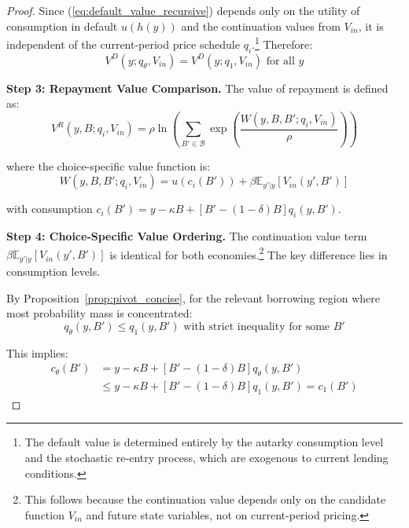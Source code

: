 \documentclass[12pt]{article}
\theoremstyle{plain}
\begin{document}
\begin{proof}
	Since (\ref{eq:default_value_recursive}) depends only on the utility of
	consumption in default $u(h(y))$ and the continuation values from $V_{in}$, it
	is independent of the current-period price schedule $q_i$.\footnote{The default
		value is determined entirely by the autarky consumption level and the
		stochastic re-entry process, which are exogenous to current lending
		conditions.} Therefore:
	\begin{equation}
		V^D(y; q_\theta, V_{in}) = V^D(y; q_1, V_{in}) \text{ for all } y \label{eq:default_value_equality}
	\end{equation}

	\textbf{Step 3: Repayment Value Comparison.} The value of repayment is defined as:
	\begin{equation}
		V^R(y, B; q_i, V_{in}) = \rho \ln\left( \sum_{B' \in \mathcal{B}} \exp\left(\frac{W(y, B, B'; q_i, V_{in})}{\rho}\right) \right) \label{eq:repayment_value}
	\end{equation}

	where the choice-specific value function is:
	\begin{equation}
		W(y, B, B'; q_i, V_{in}) = u(c_i(B')) + \beta \mathbb{E}_{y'|y}[V_{in}(y',B')] \label{eq:choice_specific_value_welfare}
	\end{equation}

	with consumption $c_i(B') = y - \kappa B + [B' - (1-\delta)B]q_i(y,B')$.

	\textbf{Step 4: Choice-Specific Value Ordering.} The continuation value term $\beta \mathbb{E}_{y'|y}[V_{in}(y',B')]$ is identical for both economies.\footnote{This follows because the continuation value depends only on the candidate function $V_{in}$ and future state
		variables, not on current-period pricing.} The key difference lies in
	consumption levels.

	By Proposition~\ref{prop:pivot_concise}, for the relevant borrowing region
	where most probability mass is concentrated:
	\begin{equation}
		q_\theta(y, B') \leq q_1(y, B') \text{ with strict inequality for some } B' \label{eq:price_ordering_welfare}
	\end{equation}

	This implies:
	\begin{align}
		c_\theta(B') & = y - \kappa B + [B' - (1-\delta)B]q_\theta(y,B') \nonumber                               \\
		             & \leq y - \kappa B + [B' - (1-\delta)B]q_1(y,B') = c_1(B') \label{eq:consumption_ordering}
	\end{align}


\end{proof}
\end{document}
